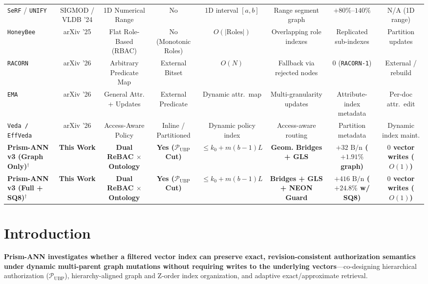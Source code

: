 \documentclass[conference]{IEEEtran}
\begin{document}
\begin{table}[t]
{\begin{tabular}{lccccccc}
\texttt{SeRF} \cite{zuo2024serf} / \texttt{UNIFY} \cite{liang2024unify} & SIGMOD / VLDB '24 & 1D Numerical Range & No & 1D interval $[a, b]$ & Range segment graph & $+80\%$--$140\%$ & N/A (1D range) \\
\texttt{HoneyBee} \cite{zhong2025honeybee} & arXiv '25 & Flat Role-Based (RBAC) & No (Monotonic Roles) & $O(|\text{Roles}|)$ & Overlapping role indexes & Replicated sub-indexes & Partition updates \\
\texttt{RACORN} \cite{kim2026racorn} & arXiv '26 & Arbitrary Predicate Map & External Bitset & $O(N)$ & Fallback via rejected nodes & $0$ (\texttt{RACORN-1}) & External / rebuild \\
\texttt{EMA} \cite{li2026ema} & arXiv '26 & General Attr. + Updates & External Predicate & Dynamic attr.\ map & Multi-granularity updates & Attribute-index metadata & Per-doc attr.\ edit \\
\texttt{Veda / EffVeda} \cite{veda2026} & arXiv '26 & Access-Aware Policy & Inline / Partitioned & Dynamic policy index & Access-aware routing & Partition metadata & Dynamic index maint. \\
\midrule
\textbf{Prism-ANN v3 (Graph Only)}$^\dagger$ & \textbf{This Work} & \textbf{Dual ReBAC $\times$ Ontology} & \textbf{Yes ($\mathcal{P}_{\text{UBP}}$ Cut)} & \textbf{$\le k_0 + m(b-1)L$} & \textbf{Geom. Bridges + GLS} & \textbf{$+32\text{ B/n}$ ($+1.91\%$ graph)} & \textbf{$0$ vector writes ($O(1)$)} \\
\textbf{Prism-ANN v3 (Full + SQ8)}$^\dagger$ & \textbf{This Work} & \textbf{Dual ReBAC $\times$ Ontology} & \textbf{Yes ($\mathcal{P}_{\text{UBP}}$ Cut)} & \textbf{$\le k_0 + m(b-1)L$} & \textbf{Bridges + GLS + NEON Guard} & \textbf{$+416\text{ B/n}$ ($+24.8\%$ w/ SQ8)} & \textbf{$0$ vector writes ($O(1)$)} \\
\bottomrule
\end{tabular}
}
\end{table}

\section{Introduction}
\label{sec:intro}

\textbf{Prism-ANN investigates whether a filtered vector index can preserve exact, revision-consistent authorization semantics under dynamic multi-parent graph mutations without requiring writes to the underlying vectors}---co-designing hierarchical authorization ($\mathcal{P}_{\text{UBP}}$), hierarchy-aligned graph and Z-order index organization, and adaptive exact/approximate retrieval.
\end{document}
